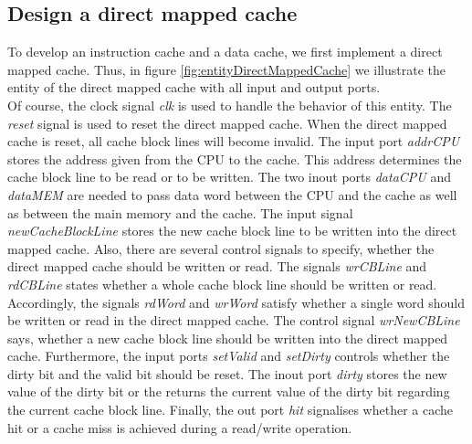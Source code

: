 \newpage
\subsection{Design a direct mapped cache}
\label{sec:designDirectMappedCache}
To develop an instruction cache and a data cache, we first implement a direct mapped cache. Thus, in figure \ref{fig:entityDirectMappedCache} we illustrate the entity of the direct mapped cache with all input and output ports.\\
Of course, the clock signal \textit{clk} is used to handle the behavior of this entity. The \textit{reset} signal is used to reset the direct mapped cache. When the direct mapped cache is reset, all cache block lines will become invalid. The input port \textit{addrCPU} stores the address given from the CPU to the cache. This address determines the cache block line to be read or to be written. The two inout ports \textit{dataCPU} and \textit{dataMEM} are needed to pass data word between the CPU and the cache as well as between the main memory and the cache. The input signal \textit{newCacheBlockLine} stores the new cache block line to be written into the direct mapped cache. Also, there are several control signals to specify, whether the direct mapped cache should be written or read. The signals \textit{wrCBLine} and \textit{rdCBLine} states whether a whole cache block line should be written or read. Accordingly, the signals \textit{rdWord} and \textit{wrWord} satisfy whether a single word should be written or read in the direct mapped cache. The control signal \textit{wrNewCBLine} says, whether a new cache block line should be written into the direct mapped cache. Furthermore, the input ports \textit{setValid} and \textit{setDirty} controls whether the dirty bit and the valid bit should be reset. The inout port \textit{dirty} stores the new value of the dirty bit or the returns the current value of the dirty bit regarding the current cache block line. Finally, the out port \textit{hit} signalises whether a cache hit or a cache miss is achieved during a read/write operation.


